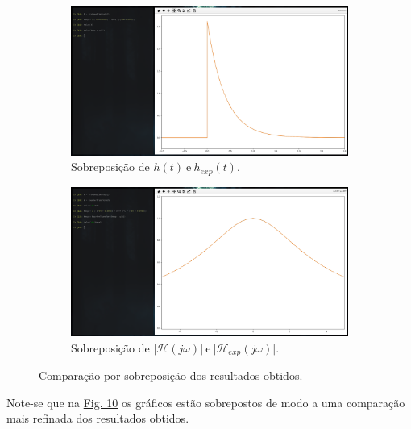 \begin{figure}[H] 
    \begin{subfigure}[b]{0.5\linewidth}
        \centering
        \includegraphics[width=1\linewidth]{prints/ht_exp.png}
        \caption{Sobreposição de \(h(t)\ \text{e}\ h_{exp}(t)\).} 
        \label{fig:ht_exp} 
    \end{subfigure}%
    \begin{subfigure}[b]{0.5\linewidth}
        \centering
        \includegraphics[width=1\linewidth]{prints/transf_ht_exp.png} 
        \caption{Sobreposição de \(\vert \mathcal{H}(j\omega)\vert \ \text{e}\ \vert \mathcal{H}_{exp}(j\omega)\vert\).} 
        \label{fig:transf_ht_exp} 
    \end{subfigure} 
    \caption{Comparação por sobreposição dos resultados obtidos.}
    \label{fig:multiplas_3}
\end{figure}

Note-se que na \hyperref[fig:multiplas_3]{Fig. 10} os gráficos estão sobrepostos de modo a uma comparação mais refinada dos resultados obtidos.

